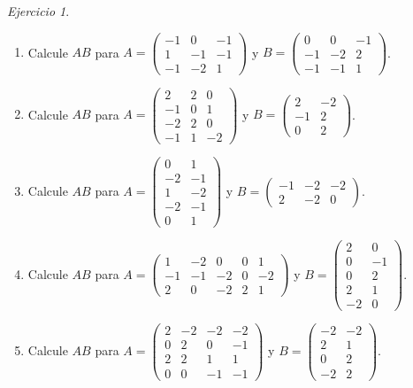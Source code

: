 \documentclass[12pt]{article}
\theoremstyle{remark}
\newtheorem{Ejer}[definicion]{Ejercicio}
\begin{document}
\begin{Ejer}
\begin{enumerate}[resume=banco]
\item Calcule $AB$ para $A=\begin{pmatrix}-1&0&-1\\1&-1&-1\\-1&-2&1\end{pmatrix}$ y $B=\begin{pmatrix}0&0&-1\\-1&-2&2\\-1&-1&1\end{pmatrix}$.

\item Calcule $AB$ para $A=\begin{pmatrix}2&2&0\\-1&0&1\\-2&2&0\\-1&1&-2\end{pmatrix}$ y $B=\begin{pmatrix}2&-2\\-1&2\\0&2\end{pmatrix}$.

\item Calcule $AB$ para $A=\begin{pmatrix}0&1\\-2&-1\\1&-2\\-2&-1\\0&1\end{pmatrix}$ y $B=\begin{pmatrix}-1&-2&-2\\2&-2&0\end{pmatrix}$.

\item Calcule $AB$ para $A=\begin{pmatrix}1&-2&0&0&1\\-1&-1&-2&0&-2\\2&0&-2&2&1\end{pmatrix}$ y $B=\begin{pmatrix}2&0\\0&-1\\0&2\\2&1\\-2&0\end{pmatrix}$.

\item Calcule $AB$ para $A=\begin{pmatrix}2&-2&-2&-2\\0&2&0&-1\\2&2&1&1\\0&0&-1&-1\end{pmatrix}$ y $B=\begin{pmatrix}-2&-2\\2&1\\0&2\\-2&2\end{pmatrix}$.


\end{enumerate}
\end{Ejer}
\end{document}
